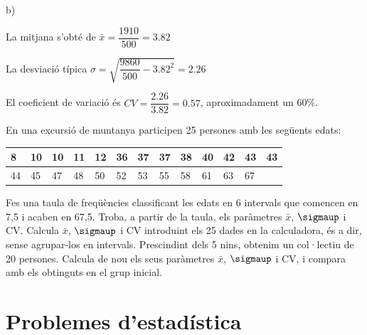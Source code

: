 \begin{resolt}
		b)
		\vspace{0.24cm}
		
		
		La mitjana s'obté de $\bar x = \dfrac{1910}{500}=3.82$
		
		La desviació típica  $\sigma = \sqrt{ \dfrac{9860}{500}-3.82^2 }=2.26$
		
		El coeficient de variació és $CV = \dfrac{2.26}{3.82}=0.57$, aproximadament un 60\%.
		
	\end{resolt}
	\vspace{1cm}

\begin{mylist}
	
\exer[1]  En una excursió de muntanya participen 25 persones amb les següents edats: 
\begin{center}
	\begin{tabular}{|p{0.27in}|p{0.27in}|p{0.27in}|p{0.27in}|p{0.27in}|p{0.27in}|p{0.27in}|p{0.27in}|p{0.27in}|p{0.27in}|p{0.27in}|p{0.27in}|p{0.27in}|} \hline
		8 & 10 & 10 & 11& 12& 36& 37& 37& 38& 40& 42& 43& 43 \\ \hline  
		44 & 45 & 47 & 48& 50& 52& 53& 55& 58& 61& 63& 67&  \\ \hline 
\end{tabular}
\end{center}
\begin{tasks}
\task Fes una taula de freqüències classificant les edats en 6 intervals que comencen en 7,5 i acaben en 67,5. Troba, a partir de la taula, els paràmetres $\bar{x}$, $\sigmaup$  i CV.
\task Calcula $\bar{x}$, $\sigmaup$  i CV  introduint els 25 dades en la calculadora, és a dir, sense agrupar-los en intervals.
\task Prescindint dels 5 nins, obtenim un col·lectiu de 20 persones. Calcula de nou els seus paràmetres $\bar{x}$, $\sigmaup$ i CV,  i compara amb els obtinguts en el grup inicial.
\end{tasks}

\answers[cols=1]{[$\bar x=40.4$; $\sigma=16.5$; $CV=0.407$,  $\bar x=40.4$; $\sigma=17.11$; $CV=0.424$, $\bar x=48.6$; $\sigma=8.77$; $CV=0.18$]}

\end{mylist}


\newpage

 \section{Problemes d'estadística}

